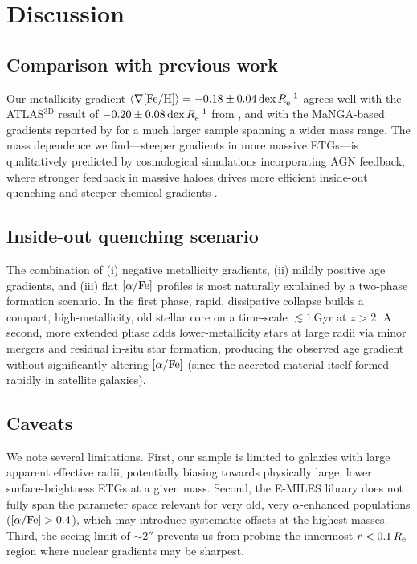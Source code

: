 \section{Discussion}
\label{sec:discussion}

\subsection{Comparison with previous work}

Our metallicity gradient
$\langle\nabla[\mathrm{Fe/H}]\rangle = -0.18 \pm 0.04\,\mathrm{dex}\,R_{\mathrm{e}}^{-1}$
agrees well with the ATLAS$^{\mathrm{3D}}$ result of
$-0.20 \pm 0.08\,\mathrm{dex}\,R_{\mathrm{e}}^{-1}$ from \citet{Kuntschner2010},
and with the MaNGA-based gradients reported by \citet{Goddard2017}
for a much larger sample spanning a wider mass range.
The mass dependence we find---steeper gradients in more massive
ETGs---is qualitatively predicted by cosmological simulations
incorporating AGN feedback, where stronger feedback in massive haloes
drives more efficient inside-out quenching and steeper chemical
gradients \citep{Greene2015}.

\subsection{Inside-out quenching scenario}

The combination of (i) negative metallicity gradients, (ii) mildly
positive age gradients, and (iii) flat $[\alpha/\mathrm{Fe}]$ profiles is most
naturally explained by a two-phase formation scenario.
In the first phase, rapid, dissipative collapse builds a compact,
high-metallicity, old stellar core on a time-scale
$\lesssim 1\,\mathrm{Gyr}$ at $z > 2$.
A second, more extended phase adds lower-metallicity stars at large
radii via minor mergers and residual in-situ star formation,
producing the observed age gradient without significantly altering
$[\alpha/\mathrm{Fe}]$ (since the accreted material itself formed rapidly in
satellite galaxies).

\subsection{Caveats}

We note several limitations.
First, our sample is limited to galaxies with large apparent
effective radii, potentially biasing towards physically large, lower
surface-brightness ETGs at a given mass.
Second, the E-MILES library does not fully span the parameter space
relevant for very old, very $\alpha$-enhanced populations
($[\alpha/\mathrm{Fe}] > 0.4$), which may introduce systematic offsets at the highest
masses.
Third, the seeing limit of $\sim$$2''$ prevents us from probing
the innermost $r < 0.1\,R_{\mathrm{e}}$ region where nuclear gradients may be
sharpest.

